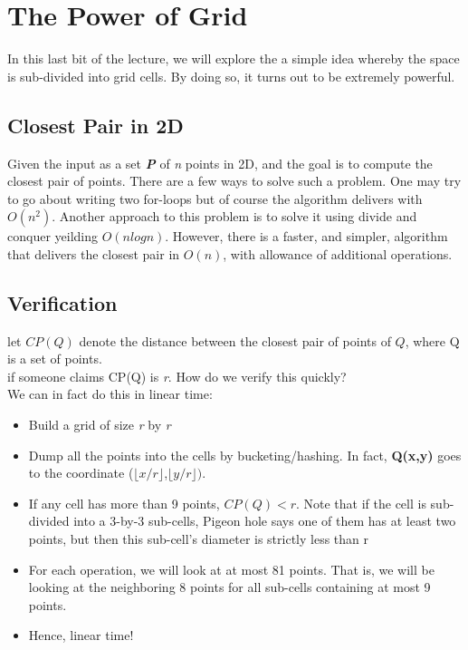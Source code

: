 \documentclass[12pt]{article}
\begin{document}
\section{The Power of Grid}
     In this last bit of the lecture, we will explore the a simple idea whereby the space is sub-divided into grid cells. By doing so, it turns out to be extremely powerful.
\subsection{Closest Pair in 2D}
 Given the input as a set \textbf{\textit{P}} of \textit{n} points in 2D, and the goal is to compute the closest pair of points. There are a few ways to solve such a problem. One may try to go about writing two for-loops but of course the algorithm delivers with $O(n^2)$. Another approach to this problem is to solve it using divide and conquer yeilding $O(nlogn)$. 
 However, there is a faster, and simpler, algorithm that delivers the closest pair in $O(n)$, with allowance of additional operations. \\
\subsection{Verification}
 let $CP(Q) $ denote  the distance between the closest pair of points of $Q$, where Q is a set of points.  \\
 if someone claims CP(Q) is \textit{r}. How do we verify this quickly?\\
 We can in fact do this in linear time:
 \begin{itemize}
     \item Build a grid of size \textit{r} by \textit{r}
     \item Dump all the points into the cells by bucketing/hashing. In fact, \textbf{Q(x,y)} goes to the coordinate ($\lfloor{x/r}\rfloor$,$\lfloor{y/r}\rfloor)$.
     \item If any cell has more than 9 points, $CP(Q) < r$. Note that if the cell is sub-divided into a 3-by-3 sub-cells, Pigeon hole says one of them has at least two points, but then this sub-cell's diameter is strictly less than r
     \item For each operation, we will look at at most 81 points. That is, we will be looking at the neighboring 8 points for all sub-cells containing at most 9 points. 
     \item Hence, linear time!
 \end{itemize}
\end{document}
